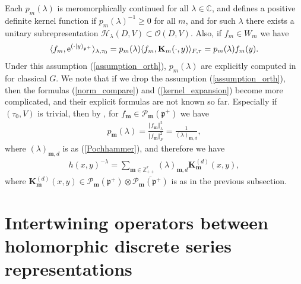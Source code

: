 \documentclass[pdftex]{sigma}
\numberwithin{equation}{section}
\newcommand{\bK}{\mathbf{K}}
\newcommand{\bm}{\mathbf{m}}
\newcommand{\BZ}{\mathbb{Z}}
\newcommand{\BC}{\mathbb{C}}
\newcommand{\fp}{\mathfrak{p}}
\newcommand{\cH}{\mathcal{H}}
\newcommand{\cO}{\mathcal{O}}
\newcommand{\cP}{\mathcal{P}}
\begin{document}
Each $p_m(\lambda)$ is meromorphically continued for all $\lambda\in\BC$, and defines a positive definite kernel function if
$p_m(\lambda)^{-1}\ge 0$ for all $m$, and for such $\lambda$ there exists a unitary subrepresentation $\cH_\lambda(D,V)\subset\cO(D,V)$.
Also, if $f_m\in W_m$ we have
\begin{gather}\label{exp_onD}
\langle f_m,{\rm e}^{(\cdot|y)_{\fp^+}}\rangle_{\lambda,\tau_0}=p_m(\lambda)\langle f_m,\bK_m(\cdot,y)\rangle_{F,\tau}=p_m(\lambda)f_m(y).
\end{gather}
Under this assumption (\ref{assumption_orth}), $p_m(\lambda)$ are explicitly computed in \cite{N2} for classical $G$.
We note that if we drop the assumption (\ref{assumption_orth}), then the formulas (\ref{norm_compare}) and (\ref{kernel_expansion}) become
more complicated, and their explicit formulas are not known so far.
Especially if $(\tau_0,V)$ is trivial,
then by \cite[Part~III, Corollary~V.3.9]{FKKLR}, \cite{FK0} for $f_\bm\in\cP_\bm(\fp^+)$ we have
\begin{gather}\label{scalar_norm}
p_\bm(\lambda)=\frac{\Vert f_\bm\Vert_\lambda^2}{\Vert f_\bm\Vert_F^2}=\frac{1}{(\lambda)_{\bm,d}},
\end{gather}
where $(\lambda)_{\bm,d}$ is as (\ref{Pochhammer}), and therefore we have
\begin{gather}\label{ext_of_h}
h(x,y)^{-\lambda}=\sum_{\bm\in\BZ_{++}^r}(\lambda)_{\bm,d}\bK_\bm^{(d)}(x,y),
\end{gather}
where $\bK_\bm^{(d)}(x,y)\in\cP_\bm(\fp^+)\otimes \overline{\cP_\bm(\fp^+)}$ is as in the previous subsection.

\section[Intertwining operators between holomorphic discrete series representations]{Intertwining operators between holomorphic discrete series\\ representations}\label{section3}
\end{document}
